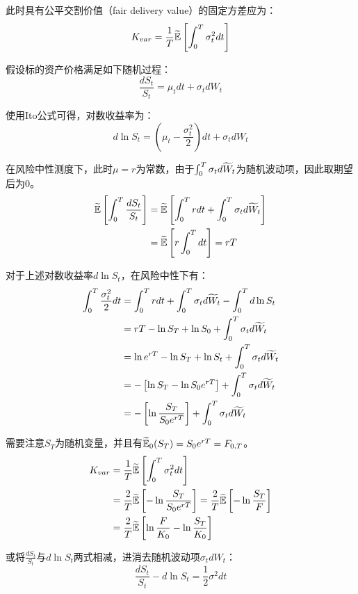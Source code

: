 \documentclass[11pt]{article}
\begin{document}
此时具有公平交割价值（fair delivery value）的固定方差应为：
\begin{equation*}
    K_{var} = \frac{1}{T} \widetilde{\mathbb{E}} \left[ \int^T_0 \sigma^2_t dt \right]
\end{equation*}

假设标的资产价格满足如下随机过程：
\begin{equation*}
    \frac{dS_t}{S_t} = \mu_t dt + \sigma_t dW_t
\end{equation*}

使用Ito公式可得，对数收益率为：
\begin{equation*}
    d \ln S_t = \left(\mu_t - \frac{\sigma^2_t}{2} \right) dt + \sigma_t dW_t
\end{equation*}

在风险中性测度下，此时$\mu=r$为常数，由于$\int^T_0 \sigma_t d\widetilde{W}_t$为随机波动项，因此取期望后为0。
\begin{align*}
    \widetilde{\mathbb{E}} \left[ \int_0^T \frac{dS_t}{S_t} \right] 
    &= \widetilde{\mathbb{E}} \left[ \int^T_0 r dt + \int^T_0 \sigma_t d\widetilde{W}_t \right] \\
    &= \widetilde{\mathbb{E}} \left[ r \int^T_0 dt \right] = rT
\end{align*}

对于上述对数收益率$d\ln S_t$，在风险中性下有：
\begin{align*}
    \int^T_0 \frac{\sigma^2_t}{2} dt 
    &= \int^T_0 r dt + \int^T_0 \sigma_t d\widetilde{W}_t -\int^T_0 d\ln S_t \\
    &= rT - \ln S_T + \ln S_0 + \int^T_0 \sigma_t d\widetilde{W}_t \\
    &= \ln e^{rT} -\ln S_T + \ln S_t + \int^T_0 \sigma_t d\widetilde{W}_t \\
    &= - \left[ \ln S_T - \ln S_0 e^{rT} \right] + \int^T_0 \sigma_t d\widetilde{W}_t \\
    &= - \left[ \ln \frac{S_T}{S_0 e^{rT}} \right] + \int^T_0 \sigma_t d\widetilde{W}_t
\end{align*}

需要注意$S_T$为随机变量，并且有$\widetilde{\mathbb{E}}_0(S_T)=S_0 e^{rT}=F_{0,T}$。
\begin{align*}
    K_{var} &= \frac{1}{T} \widetilde{\mathbb{E}} \left[ \int^T_0 \sigma^2_t dt \right] \\
    &= \frac{2}{T} \widetilde{\mathbb{E}} \left[ - \ln\frac{S_T}{S_0 e^{rT}} \right] 
    = \frac{2}{T} \widetilde{\mathbb{E}} \left[ - \ln\frac{S_T}{F} \right] \\
    &= \frac{2}{T} \widetilde{\mathbb{E}} \left[\ln\frac{F}{K_0} - \ln\frac{S_T}{K_0}  \right]
\end{align*}

或将$\frac{dS_t}{S_t}$与$d\ln S_t$两式相减，进消去随机波动项$\sigma_t dW_t$：
\begin{equation*}
    \frac{d S_t}{S_t} - d \ln S_t = \frac{1}{2}\sigma^2 dt
\end{equation*}
\end{document}
